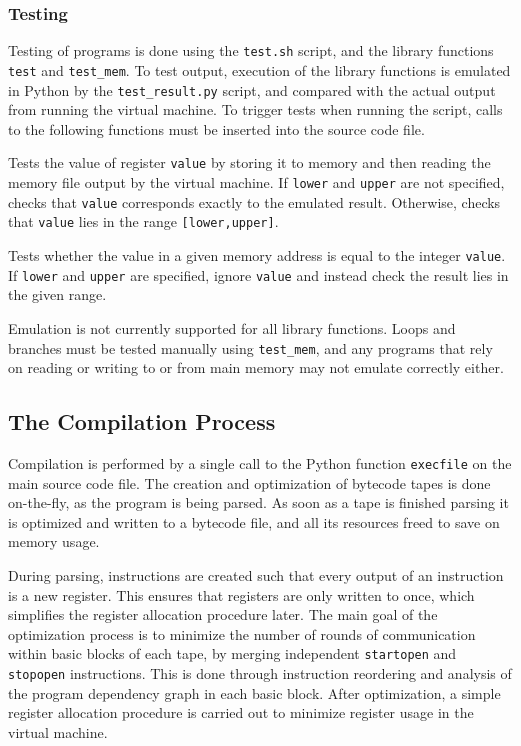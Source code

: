 \subsubsection{Testing}

Testing of programs is done using the \verb|test.sh| script, and the library
functions \verb|test| and \verb|test_mem|. To test output, execution of the
library functions is emulated in Python by the \verb|test_result.py| script,
and compared with the actual output from running the virtual machine.
To trigger tests when running the script, calls to the following functions
must be inserted into the source code file.

Tests the value of register \verb|value| by storing it to memory and then
reading the memory file output by the virtual machine. If \verb|lower| and
\verb|upper| are
not specified, checks that \verb|value| corresponds exactly to the emulated
result. Otherwise, checks that \verb|value| lies in the range
\verb|[lower,upper]|.

Tests whether the value in a given memory address is equal to the integer
\verb|value|. If \verb|lower| and \verb|upper| are specified, ignore \verb|value|
and instead check the result lies in the given range.

Emulation is not currently supported for all library functions. Loops and
branches must be tested manually using \verb|test_mem|, and any programs that
rely on reading or writing to or from main memory may not emulate correctly
either.

\subsection{The Compilation Process}
Compilation is performed by a single call to the Python function
\verb|execfile| on the main source code file. The creation and optimization
of bytecode tapes is done on-the-fly, as the program is being parsed. As soon
as a tape is finished parsing it is optimized and written to a bytecode
file, and all its resources freed to save on memory usage.

During parsing, instructions are created such that every output of an
instruction is a new register. This ensures that registers are only written to
once, which simplifies the register allocation procedure later.
The main goal of the optimization process is to minimize the number of rounds
of communication within basic blocks of each tape, by merging independent
\verb|startopen| and \verb|stopopen| instructions. This is done through
instruction reordering and analysis of the program dependency graph in
each basic block. After optimization, a simple register allocation procedure
is carried out to minimize register usage in the virtual machine.

